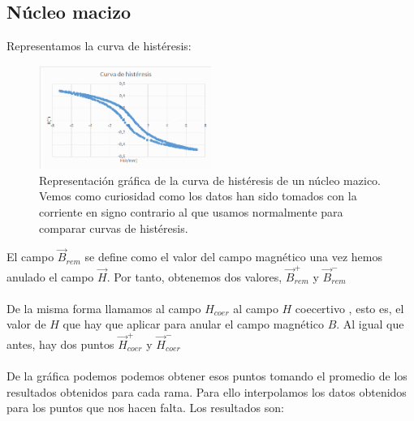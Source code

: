 \documentclass[11pt,letterpaper,twocolumn]{article}
\begin{document}
\subsection{Núcleo macizo}%
\label{sec:}
Representamos la curva de histéresis:
\vfill
\hfill
\begin{figure}[H]
	\centering
	\includegraphics[width=0.5\textwidth]{imagen/mazico.png}
	\caption{Representación gráfica de la curva de histéresis de un núcleo mazico. Vemos como curiosidad como los datos han sido tomados con la corriente en signo contrario al que usamos normalmente para comparar curvas de histéresis.}
	\label{fig:imagen-macizo-png}
\end{figure}
El campo $\vec{B}_{rem}$ se define como el valor del campo magnético una vez hemos anulado el campo  $\vec{H}$. Por tanto, obtenemos dos valores,  $\vec{B}^+_{rem}$ y  $\vec{B}^-_{rem}$\\
\\
De la misma forma llamamos al campo $H_{coer}$ al campo  $H$ coecertivo , esto es, el valor de $H$ que hay que aplicar para anular el campo magnético $B$. Al igual que antes, hay dos puntos $\vec{H}^+_{coer}$ y  $\vec{H}^-_{coer}$\\
\\

De la gráfica podemos podemos obtener esos puntos  tomando el promedio de los resultados obtenidos para cada rama. Para ello interpolamos los datos obtenidos para los puntos que nos hacen falta. Los resultados son:
\end{document}
